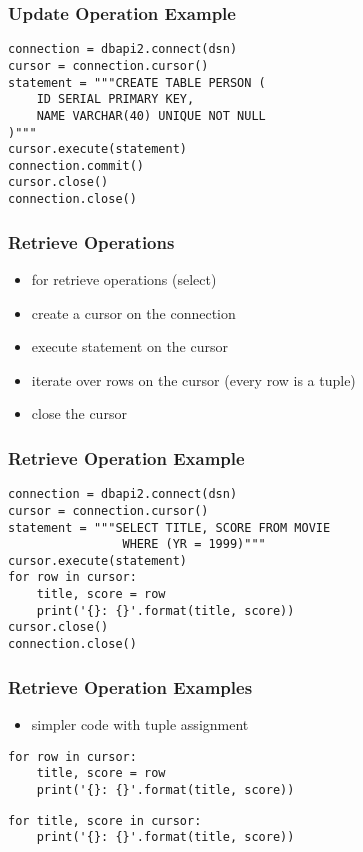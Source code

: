 \documentclass[dvipsnames]{beamer}
\theoremstyle{plain}
\begin{document}
\begin{frame}[fragile]
  \frametitle{Update Operation Example}

  \begin{lstlisting}
connection = dbapi2.connect(dsn)
cursor = connection.cursor()
statement = """CREATE TABLE PERSON (
    ID SERIAL PRIMARY KEY,
    NAME VARCHAR(40) UNIQUE NOT NULL
)"""
cursor.execute(statement)
connection.commit()
cursor.close()
connection.close()
  \end{lstlisting}
\end{frame}

\begin{frame}
  \frametitle{Retrieve Operations}

  \begin{itemize}
    \item for retrieve operations (select)

    \bigskip
    \item create a cursor on the connection
    \item execute statement on the cursor
    \item iterate over rows on the cursor (every row is a tuple)
    \item close the cursor
  \end{itemize}
\end{frame}

\begin{frame}[fragile]
  \frametitle{Retrieve Operation Example}

  \begin{lstlisting}
connection = dbapi2.connect(dsn)
cursor = connection.cursor()
statement = """SELECT TITLE, SCORE FROM MOVIE
                WHERE (YR = 1999)"""
cursor.execute(statement)
for row in cursor:
    title, score = row
    print('{}: {}'.format(title, score))
cursor.close()
connection.close()
  \end{lstlisting}
\end{frame}

\begin{frame}[fragile]
  \frametitle{Retrieve Operation Examples}

  \begin{itemize}
    \item simpler code with tuple assignment
  \end{itemize}

  \begin{lstlisting}
for row in cursor:
    title, score = row
    print('{}: {}'.format(title, score))
  \end{lstlisting}

  \begin{lstlisting}
for title, score in cursor:
    print('{}: {}'.format(title, score))
  \end{lstlisting}
\end{frame}
\end{document}
